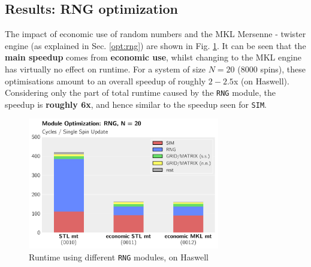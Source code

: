 \documentclass[letterpaper]{article}
\begin{document}
\subsection{Results: RNG optimization}\label{res:RNG}
The impact of economic use of random numbers and the MKL Mersenne - twister engine (as explained in Sec. \ref{opt:rng}) are shown in Fig. \ref{RNG:Has:20}. \newline
It can be seen that the \textbf{main speedup} comes from \textbf{economic use}, whilst changing to the MKL engine has virtually no effect on runtime. \newline
For a system of size $N = 20$ ($8000$ spins), these optimisations amount to an overall speedup of roughly $2 - 2.5$x (on Haswell). Considering only the part of total runtime caused by the \texttt{RNG} module, the speedup is \textbf{roughly $\mathbf{6}$x}, and hence similar to the speedup seen for \texttt{SIM}.
	\begin{figure}[h]\centering
	  \includegraphics[width = 8.36cm]{plots/dg_20_0.pdf}
	  \caption{Runtime using different \texttt{RNG} modules, on Haswell}
	  \label{RNG:Has:20}
	\end{figure}
\end{document}
